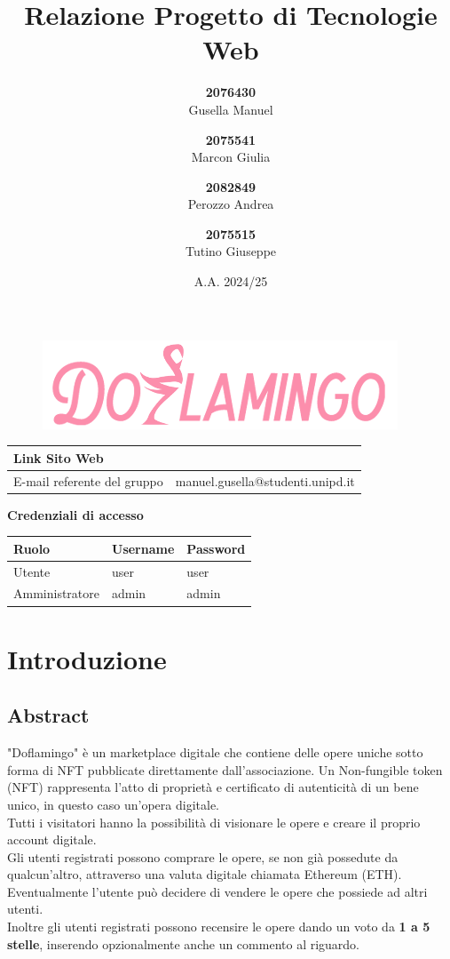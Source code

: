\documentclass[10pt]{article}
\title{Relazione Progetto di Tecnologie Web}
\author{
    \textbf{2076430}\\ Gusella Manuel \and
    \textbf{2075541}\\ Marcon Giulia \and
    \textbf{2082849}\\ Perozzo Andrea \and
    \textbf{2075515}\\ Tutino Giuseppe
}
\date{A.A. 2024/25}
\begin{document}
\begin{figure}
    \centering
    \includegraphics[width=0.5\linewidth]{logo.png}
\end{figure}
\maketitle
\renewcommand{\arraystretch}{2}
\begin{tabular}{|>{\centering\arraybackslash}m{7cm}|>{\centering\arraybackslash}m{8cm}|}
    \hline
     Link Sito Web & \url{} \\
     \hline
     E-mail referente del gruppo & manuel.gusella@studenti.unipd.it \\
    \hline
\end{tabular}

\vspace{0.5cm} 
\begin{center}
    \textbf{\Large Credenziali di accesso}
\end{center}
\vspace{0.5cm} 
\begin{tabularx}{\textwidth}{|>{\centering\arraybackslash}X|>{\centering\arraybackslash}X|>{\centering\arraybackslash}X|}
    \hline
    Ruolo & Username & Password \\
    \hline
    Utente & user & user \\
    \hline
    Amministratore & admin & admin \\
    \hline
\end{tabularx}

\newpage
\tableofcontents
\newpage

\section{Introduzione}
\subsection{Abstract}
"Doflamingo" è un marketplace digitale che contiene delle opere uniche sotto forma di NFT pubblicate direttamente dall'associazione.
Un Non-fungible token (NFT) rappresenta l'atto di proprietà e certificato di autenticità di un bene unico, in questo caso un'opera digitale. \\
Tutti i visitatori hanno la possibilità di visionare le opere e creare il proprio account digitale.\\
Gli utenti registrati possono comprare le opere, se non già possedute da qualcun'altro, attraverso una valuta digitale chiamata Ethereum (ETH). Eventualmente l'utente può decidere di vendere le opere che possiede ad altri utenti.\\ 
Inoltre gli utenti registrati possono recensire le opere dando un voto da \textbf{1 a 5 stelle}, inserendo opzionalmente anche un commento al riguardo.\\
\end{document}
